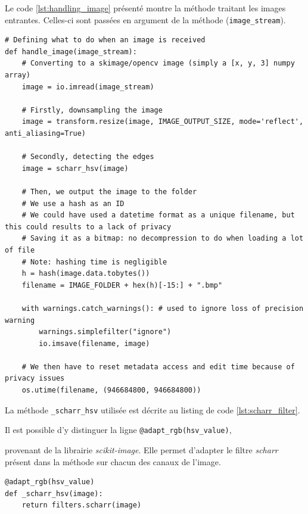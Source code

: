 Le code \ref{lst:handling_image} présenté montre la méthode traitant les images entrantes. Celles-ci sont passées en argument de la méthode (\lstinline[columns=fixed]{image_stream}).


\begin{lstlisting}[caption={Traitement des images reçues}, label={lst:handling_image}] 
# Defining what to do when an image is received
def handle_image(image_stream):
    # Converting to a skimage/opencv image (simply a [x, y, 3] numpy array)
    image = io.imread(image_stream)

    # Firstly, downsampling the image
    image = transform.resize(image, IMAGE_OUTPUT_SIZE, mode='reflect', anti_aliasing=True)

    # Secondly, detecting the edges
    image = scharr_hsv(image)

    # Then, we output the image to the folder
    # We use a hash as an ID
    # We could have used a datetime format as a unique filename, but this could results to a lack of privacy
    # Saving it as a bitmap: no decompression to do when loading a lot of file
    # Note: hashing time is negligible
    h = hash(image.data.tobytes())
    filename = IMAGE_FOLDER + hex(h)[-15:] + ".bmp"

    with warnings.catch_warnings(): # used to ignore loss of precision warning
        warnings.simplefilter("ignore")
        io.imsave(filename, image)

    # We then have to reset metadata access and edit time because of privacy issues
    os.utime(filename, (946684800, 946684800))
\end{lstlisting}

La méthode \lstinline[columns=fixed]{_scharr_hsv} utilisée est décrite au listing de code \ref{lst:scharr_filter}. 

Il est possible d'y distinguer la ligne \lstinline[columns=fixed]{@adapt_rgb(hsv_value)}, 

provenant de la librairie \textit{scikit-image}. Elle permet d'adapter le filtre \textit{scharr} présent dans la méthode sur chacun des canaux de l'image.

\begin{lstlisting}[caption={Détection de bord à l'aide de \textit{scikit-image}}, label={lst:scharr_filter}] 
@adapt_rgb(hsv_value)
def _scharr_hsv(image):
    return filters.scharr(image)
\end{lstlisting}

